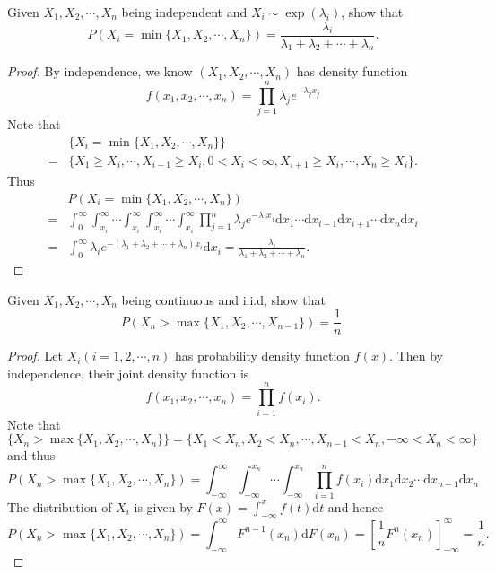 \documentclass[11pt,singlecolumn, openany, citestyle=authoryear]{elegantbook}
\begin{document}
\begin{CJK}{UTF8}{gbsn}
\begin{exercise}
    Given $X_1,X_2,\cdots,X_n$ being independent and $X_i\sim \operatorname{exp}(\lambda_i)$,
    show that 
    $$
    P(X_i = \min\{X_1,X_2,\cdots,X_n\})=\frac{\lambda_i}{\lambda_1+\lambda_2+\cdots + 
    \lambda_n}.
    $$
\end{exercise}
\begin{proof}
    By independence, we know $(X_1,X_2,\cdots,X_n)$ has density function 
    $$
    f(x_1,x_2,\cdots,x_n)=\prod_{j=1}^n \lambda_j e^{-\lambda_j x_j}
    $$
    Note that 
    \begin{align*}
        &\{X_i = \min\{X_1,X_2,\cdots,X_n\}\}\\
        =&\{X_1\geqslant X_i,\cdots,X_{i-1}\geqslant X_i, 
        0<X_i<\infty, X_{i+1}\geqslant X_i,\cdots,X_n\geqslant X_i\}.
    \end{align*}
    Thus 
    \begin{align*}
        &P(X_i = \min\{X_1,X_2,\cdots,X_n\})\\
        =&\int_0^\infty \int_{x_i}^\infty \cdots \int_{x_i}^\infty \int_{x_i}^\infty
        \cdots \int_{x_i}^\infty \prod_{j=1}^n \lambda_j e^{-\lambda_j x_j}
        \mathrm{d}x_1\cdots \mathrm{d}x_{i-1} \mathrm{d}x_{i+1}\cdots
        \mathrm{d}x_n\mathrm{d}x_{i}\\
        =& \int_{0}^\infty \lambda_i e^{-(\lambda_1+\lambda_2+\cdots+\lambda_n)x_i}
        \mathrm{d}x_i = \frac{\lambda_i}{\lambda_1+\lambda_2+\cdots + \lambda_n}.
    \end{align*}
\end{proof}

\begin{exercise}
    Given $X_1,X_2,\cdots,X_n$ being continuous and i.i.d, show that 
    $$
    P(X_n > \max \{X_1,X_2,\cdots,X_{n-1}\})=\frac{1}{n}.
    $$
\end{exercise}
\begin{proof}
    Let $X_i (i=1,2,\cdots,n)$ has probability density function $f(x)$. Then by independence,
    their joint density function is 
    $$
    f(x_1,x_2,\cdots,x_n)=\prod_{i=1}^n f(x_i).
    $$
    Note that 
    $$
    \{X_n > \max \{X_1,X_2,\cdots,X_n\}\}=\{X_1<X_n,X_2<X_n,\cdots,X_{n-1}<X_n, -\infty < X_n < \infty\}
    $$
    and thus 
    $$
    P(X_n > \max \{X_1,X_2,\cdots,X_n\}) = 
    \int_{-\infty}^\infty \int_{-\infty}^{x_n} \cdots \int_{-\infty}^{x_n}
    \prod_{i=1}^n f(x_i)\mathrm{d}x_1\mathrm{d}x_2\cdots \mathrm{d}x_{n-1}\mathrm{d}x_n
    $$
    The distribution of $X_i$ is given by $F(x)=\displaystyle \int_{-\infty}^x 
    f(t)\mathrm{d}t$ and hence 
    $$
    P(X_n > \max \{X_1,X_2,\cdots,X_n\}) = \int_{-\infty}^\infty F^{n-1}(x_n)\mathrm{d}
    F(x_n) = \left[\frac{1}{n}F^n(x_n)\right]_{-\infty}^\infty = \frac{1}{n}.
    $$
\end{proof}


\end{CJK}
\end{document}
